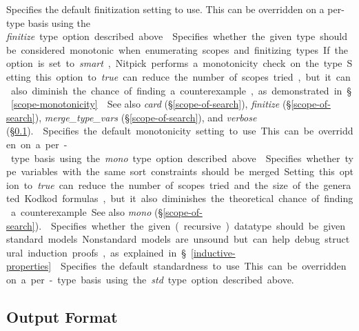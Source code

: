 \documentclass[a4paper,12pt]{article}
\begin{document}
\begin{enum}
Specifies the default finitization setting to use. This can be overridden on a
per-type basis using the \textit{finitize}~\qty{type} option described above.

Specifies whether the given type should be considered monotonic when enumerating
scopes and finitizing types. If the option is set to \textit{smart}, Nitpick
performs a monotonicity check on the type. Setting this option to \textit{true}
can reduce the number of scopes tried, but it can also diminish the chance of
finding a counterexample, as demonstrated in \S\ref{scope-monotonicity}.

\nopagebreak
{\small See also \textit{card} (\S\ref{scope-of-search}),
\textit{finitize} (\S\ref{scope-of-search}),
\textit{merge\_type\_vars} (\S\ref{scope-of-search}), and \textit{verbose}
(\S\ref{output-format}).}

Specifies the default monotonicity setting to use. This can be overridden on a
per-type basis using the \textit{mono}~\qty{type} option described above.

Specifies whether type variables with the same sort constraints should be
merged. Setting this option to \textit{true} can reduce the number of scopes
tried and the size of the generated Kodkod formulas, but it also diminishes the
theoretical chance of finding a counterexample.

{\small See also \textit{mono} (\S\ref{scope-of-search}).}

Specifies whether the given (recursive) datatype should be given standard
models. Nonstandard models are unsound but can help debug structural induction
proofs, as explained in \S\ref{inductive-properties}.

Specifies the default standardness to use. This can be overridden on a per-type
basis using the \textit{std}~\qty{type} option described above.
\end{enum}

\subsection{Output Format}
\label{output-format}
\end{document}
